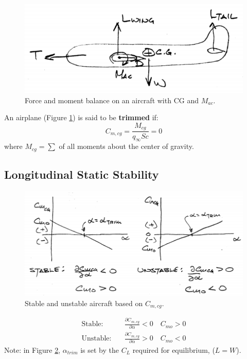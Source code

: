 \documentclass[draft=false, titlepage]{article}
\begin{document}
\begin{figure}[ht]
	\centering
	\includegraphics[width=0.6\linewidth]{Figures/p104_aircraftStability.PNG}
	\caption{Force and moment balance on an aircraft with CG and $M_{ac}$.}
	\label{fig:p104_aircraftStability}
\end{figure}
	An airplane (Figure \ref{fig:p104_aircraftStability}) is said to be \textbf{trimmed} if:
	\begin{equation}
	C_{m,cg} = \frac{M_{cg}}{q_\infty Sc} = 0
	\end{equation}
	where $M_{cg} = \sum$ of all moments about the center of gravity.

\subsection{Longitudinal Static Stability}
\begin{figure}[ht]
	\centering
	\includegraphics[width=0.6\linewidth]{Figures/p105_longitudinalStability.PNG}
	\caption{Stable and unstable aircraft based on $C_{m,cg}$.}
	\label{fig:p105_longitudinalStability}
\end{figure}
\begin{align*}
\text{Stable:}&\quad \frac{\partial C_{m,cg}}{\partial \alpha}<0 \quad C_{mo} > 0\\
\text{Unstable:}&\quad \frac{\partial C_{m,cg}}{\partial \alpha}>0 \quad C_{mo} < 0
\end{align*}
Note: in Figure \ref{fig:p105_longitudinalStability}, $\alpha_{trim}$ is set by the $C_L$ required for equilibrium, ($L=W$).
\end{document}
